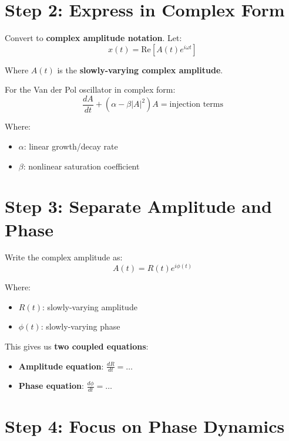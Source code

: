 \documentclass{article}
\begin{document}
\section{Step 2: Express in Complex Form}

Convert to \textbf{complex amplitude notation}. Let:
\begin{equation}
x(t) = \text{Re}[A(t)e^{i\omega t}]
\end{equation}

Where $A(t)$ is the \textbf{slowly-varying complex amplitude}.

For the Van der Pol oscillator in complex form:
\begin{equation}
\frac{dA}{dt} + (\alpha - \beta|A|^2)A = \text{injection terms}
\end{equation}

Where:
\begin{itemize}
    \item $\alpha$: linear growth/decay rate
    \item $\beta$: nonlinear saturation coefficient
\end{itemize}

\section{Step 3: Separate Amplitude and Phase}

Write the complex amplitude as:
\begin{equation}
A(t) = R(t)e^{i\phi(t)}
\end{equation}

Where:
\begin{itemize}
    \item $R(t)$: slowly-varying amplitude
    \item $\phi(t)$: slowly-varying phase
\end{itemize}

This gives us \textbf{two coupled equations}:
\begin{itemize}
    \item \textbf{Amplitude equation}: $\frac{dR}{dt} = \ldots$
    \item \textbf{Phase equation}: $\frac{d\phi}{dt} = \ldots$
\end{itemize}

\section{Step 4: Focus on Phase Dynamics}
\end{document}
